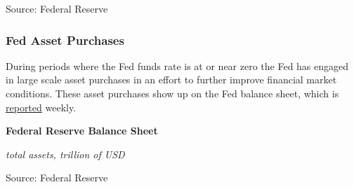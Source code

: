 \documentclass{report}
\makeatletter
\newcommand{\tbllink}[1]{\href{https://raw.githubusercontent.com/bdecon/US-chartbook/master/chartbook/data/#1}{\faTable}}
\newcommand*\short[1]{\expandafter\@gobbletwo\number\numexpr#1\relax}
\newcommand{\dateaxisticks}{
		date coordinates in=x, axis line style={draw=none},
		xmax={2020-10-01},
		max space between ticks=40,	    
		xtick={{1990-01-01}, {1992-01-01}, {1994-01-01}, 
			{1996-01-01}, {1998-01-01}, {2000-01-01}, 
			{2002-01-01}, {2004-01-01}, {2006-01-01},
			{2008-01-01}, {2010-01-01}, {2012-01-01}, {2014-01-01},
		    {2016-01-01}, {2018-01-01}, {2020-01-01}},
		minor xtick={{1989-01-01}, {1991-01-01}, {1993-01-01},
			{1995-01-01}, {1997-01-01}, {1999-01-01}, 
			{2001-01-01}, {2003-01-01}, {2005-01-01}, {2007-01-01},
		    {2009-01-01}, {2011-01-01}, {2013-01-01}, {2015-01-01},
		    {2017-01-01}, {2019-01-01}},
		enlarge y limits={0.06}, enlarge x limits={0.01},
		}
\newcommand{\bbar}[2]{extra #1 ticks = {{#2}}, extra #1 tick labels = ,
		extra #1 tick style = {grid=major, grid style={thick, black!25}},}
\newcommand{\stdline}[4]{\addplot[very thick, no markers, color=#1] 
		table [x=#2, y=#3, col sep=comma] {#4};	}
\makeatother
\begin{document}
{{{{{{{{{\begin{minipage}{0.76\textwidth}
\footnotesize{Source: Federal Reserve} \hfill \tbllink{M2imf.csv}

\end{minipage}
\newpage
\subsubsection*{\color{black!70} \seriffont Fed Asset Purchases}

\begin{minipage}{0.76\textwidth}

\small During periods where the Fed funds rate is at or near zero the Fed has engaged in large scale asset purchases in an effort to further improve financial market conditions. These asset purchases show up on the Fed balance sheet, which is \href{https://www.federalreserve.gov/releases/h41/current/default.htm}{reported} weekly. \\


\end{minipage}

\begin{minipage}{0.39\textwidth}

\vspace{2mm}

\normalsize \textbf{Federal Reserve Balance Sheet}

\footnotesize{\textit{total assets, trillion of USD}}

\hspace*{-2mm} 

\footnotesize{Source: Federal Reserve} \hspace{22mm} \tbllink{fed_assets.csv}
\end{minipage}\hspace{1mm}
\begin{minipage}{0.36\textwidth}
\small 
\end{minipage}

}}}}}}}}}
\end{document}
